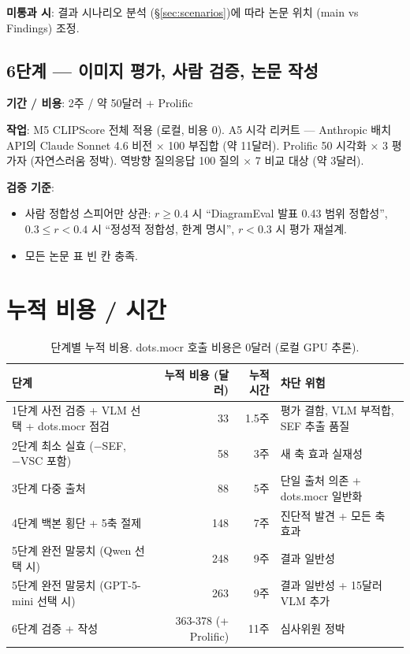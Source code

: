 \documentclass[11pt]{article}
\begin{document}
\textbf{미통과 시}: 결과 시나리오 분석 (\S \ref{sec:scenarios})에 따라 논문 위치 (main vs Findings) 조정.

\subsection{6단계 — 이미지 평가, 사람 검증, 논문 작성}

\textbf{기간 / 비용}: 2주 / 약 50달러 + Prolific

\textbf{작업}: M5 CLIPScore 전체 적용 (로컬, 비용 0). A5 시각 리커트 — Anthropic 배치 API의 Claude Sonnet 4.6 비전 × 100 부집합 (약 11달러). Prolific 50 시각화 × 3 평가자 (자연스러움 정박). 역방향 질의응답 100 질의 × 7 비교 대상 (약 3달러).

\textbf{검증 기준}:
\begin{itemize}[leftmargin=*]
    \item 사람 정합성 스피어만 상관: $r \geq 0.4$ 시 ``DiagramEval 발표 0.43 범위 정합성'', $0.3 \leq r < 0.4$ 시 ``정성적 정합성, 한계 명시'', $r < 0.3$ 시 평가 재설계.
    \item 모든 논문 표 빈 칸 충족.
\end{itemize}

\section{누적 비용 / 시간}

\begin{table}[h]
\centering
\small
\begin{tabular}{lrrl}
\toprule
단계 & 누적 비용 (달러) & 누적 시간 & 차단 위험 \\
\midrule
1단계 사전 검증 + VLM 선택 + dots.mocr 점검 & 33 & 1.5주 & 평가 결함, VLM 부적합, SEF 추출 품질 \\
2단계 최소 실효 (−SEF, −VSC 포함) & 58 & 3주 & 새 축 효과 실재성 \\
3단계 다중 출처 & 88 & 5주 & 단일 출처 의존 + dots.mocr 일반화 \\
4단계 백본 횡단 + 5축 절제 & 148 & 7주 & 진단적 발견 + 모든 축 효과 \\
5단계 완전 말뭉치 (Qwen 선택 시) & 248 & 9주 & 결과 일반성 \\
5단계 완전 말뭉치 (GPT-5-mini 선택 시) & 263 & 9주 & 결과 일반성 + 15달러 VLM 추가 \\
6단계 검증 + 작성 & 363-378 (+ Prolific) & 11주 & 심사위원 정박 \\
\bottomrule
\end{tabular}
\caption{단계별 누적 비용. dots.mocr 호출 비용은 0달러 (로컬 GPU 추론).}
\end{table}
\end{document}
